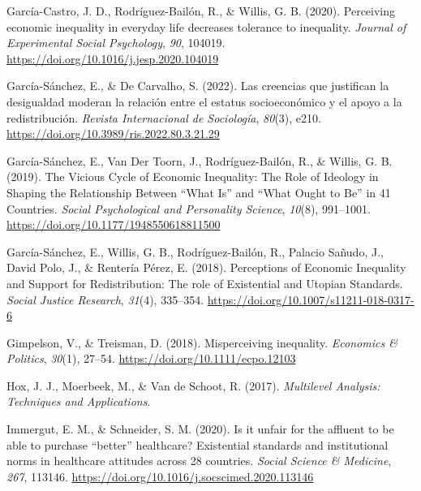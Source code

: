 \documentclass[
  12pt,
]{article}
\newlength{\cslhangindent}
\newenvironment{CSLReferences}[2] %
 {\begin{list}{}{%
  \setlength{\itemindent}{0pt}
  \setlength{\leftmargin}{0pt}
  \setlength{\parsep}{0pt}
  \ifodd #1
   \setlength{\leftmargin}{\cslhangindent}
   \setlength{\itemindent}{-1\cslhangindent}
  \fi
  \setlength{\itemsep}{#2\baselineskip}}}
 {\end{list}}
\begin{document}
\begin{CSLReferences}{1}{0}
García-Castro, J. D., Rodríguez-Bailón, R., \& Willis, G. B. (2020).
Perceiving economic inequality in everyday life decreases tolerance to
inequality. \emph{Journal of Experimental Social Psychology}, \emph{90},
104019. \url{https://doi.org/10.1016/j.jesp.2020.104019}

García-Sánchez, E., \& De Carvalho, S. (2022). Las creencias que
justifican la desigualdad moderan la relaci{ó}n entre el estatus
socioecon{ó}mico y el apoyo a la redistribuci{ó}n. \emph{Revista
Internacional de Sociolog{í}a}, \emph{80}(3), e210.
\url{https://doi.org/10.3989/ris.2022.80.3.21.29}

García-Sánchez, E., Van Der Toorn, J., Rodríguez-Bailón, R., \& Willis,
G. B. (2019). The {Vicious Cycle} of {Economic Inequality}: {The Role}
of {Ideology} in {Shaping} the {Relationship Between} {``{What Is}''}
and {``{What Ought} to {Be}''} in 41 {Countries}. \emph{Social
Psychological and Personality Science}, \emph{10}(8), 991--1001.
\url{https://doi.org/10.1177/1948550618811500}

García-Sánchez, E., Willis, G. B., Rodríguez-Bailón, R., Palacio Sañudo,
J., David Polo, J., \& Rentería Pérez, E. (2018). Perceptions of
{Economic Inequality} and {Support} for {Redistribution}: {The} role of
{Existential} and {Utopian Standards}. \emph{Social Justice Research},
\emph{31}(4), 335--354. \url{https://doi.org/10.1007/s11211-018-0317-6}

Gimpelson, V., \& Treisman, D. (2018). Misperceiving inequality.
\emph{Economics \& Politics}, \emph{30}(1), 27--54.
\url{https://doi.org/10.1111/ecpo.12103}

Hox, J. J., Moerbeek, M., \& Van de Schoot, R. (2017). \emph{Multilevel
{Analysis}: {Techniques} and {Applications}}.

Immergut, E. M., \& Schneider, S. M. (2020). Is it unfair for the
affluent to be able to purchase {``better''} healthcare? {Existential}
standards and institutional norms in healthcare attitudes across 28
countries. \emph{Social Science \& Medicine}, \emph{267}, 113146.
\url{https://doi.org/10.1016/j.socscimed.2020.113146}


\end{CSLReferences}
\end{document}
